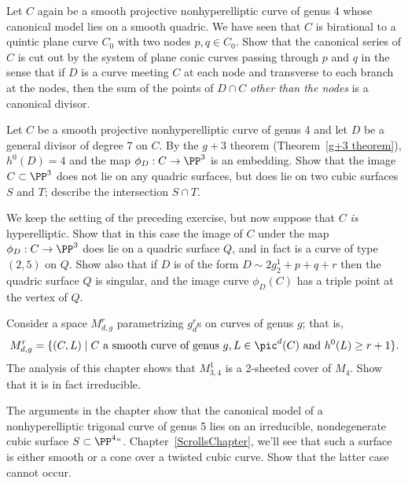 \begin{exercise}\label{ex7.2}
Let $C$ again be a smooth projective nonhyperelliptic curve of genus 4
whose canonical model lies on a smooth quadric. We have seen that $C$ is
birational
%
%
to a
quintic plane curve
%
$C_0$ with two nodes $p, q \in
C_0$. Show that the canonical series of $C$ is cut out by the system
of plane conic curves passing through $p$ and $q$ in the sense
that if $D$ is a curve meeting $C$ at each node and transverse to each
branch at the nodes, then
the sum of the points of $D\cap C$ \emph{other than the nodes} is a canonical divisor.
\end{exercise}

\begin{exercise}\label{ex7.3}
Let $C$  be a smooth projective nonhyperelliptic curve of genus 4 and
let $D$ be a general divisor of degree 7 on $C$. By the
$g+3$ theorem
%
(Theorem~\ref{g+3 theorem}), $h^0(D) = 4$ and the map $\phi_D : C \to
\PP^3$ is an embedding. Show that the image $C \subset \PP^3$ does not
lie on any quadric surfaces, but does lie on two cubic surfaces $S$
and $T$; describe the intersection $S \cap T$.
\end{exercise}

\begin{exercise}\label{ex7.4}
We keep
the setting of the preceding exercise,
but now
suppose that $C$ \emph{is} hyperelliptic. Show that in this case the
image of $C$ under the map $\phi_D : C \to \PP^3$ does lie on a
quadric surface $Q$, and in fact is a curve of type $(2,5)$ on $Q$.
Show also that if $D$ is of the form $D \sim 2g^1_2 + p + q + r$ then
the quadric surface $Q$ is singular, and the image curve $\phi_D(C)$
has a triple point at the vertex of $Q$.
\end{exercise}

\begin{exercise}\label{ex7.5}
Consider a space $M^r_{d,g}$ parametrizing $g^r_d$s on curves of genus $g$; that is,
$$
M^r_{d,g} = \{ (C, L) \mid C \text{ a smooth curve of genus } g, L \in \pic^d(C) \text{ and } h^0(L) \geq r+1 \}.
$$
The analysis of this chapter shows that
$M^1_{3,4}$
%
is a
2-sheeted cover of $M_4$.
%
Show that it is in fact irreducible.
\end{exercise}

\begin{exercise}\label{ex7.6}
The arguments in the chapter show that the canonical model of a
nonhyperelliptic trigonal curve of genus 5 lies on an irreducible,
nondegenerate
cubic surface $S \subset \PP^4` `$.
%
Chapter~\ref{ScrollsChapter}, we'll see that such a surface is either
smooth or a cone over a twisted cubic curve. Show that the latter case
cannot occur.
\end{exercise}


